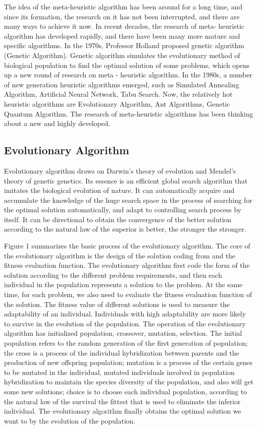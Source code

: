 The idea of the meta-heuristic algorithm has been around for a long
time, and since its formation, the research on it has not been
interrupted, and there are many ways to achieve it now. In recent
decades, the research of meta- heuristic algorithm has developed
rapidly, and there have been many more mature and specific
algorithms. In the 1970s, Professor Holland proposed genetic
algorithm\cite{holland} (Genetic Algorithm). Genetic algorithm
simulates the evolutionary method of biological population to find the
optimal solution of some problems, which opens up a new round of
research on meta - heuristic algorithm. In the 1980s, a number of new
generation heuristic algorithms emerged, such as Simulated Annealing
Algorithm, Artificial Neural Network, Tabu Search. Now, the relatively
hot heuristic algorithms are Evolutionary Algorithm, Ant Algorithms,
Genetic Quantum Algorithm. The research of meta-heuristic algorithms
has been thinking about a new and highly developed\cite{harman}.


\subsection{Evolutionary Algorithm}
%
Evolutionary algorithm draws on Darwin's theory of evolution and
Mendel's theory of genetic genetics. Its essence is an efficient
global search algorithm that imitates the biological evolution of
nature. It can automatically acquire and accumulate the knowledge of
the huge search space in the process of searching for the optimal
solution automatically, and adapt to controlling search process by
itself. It can be directional to obtain the convergence of the better
solution according to the natural law of the superior is better, the
stronger the stronger\cite{deb}.


Figure 1 summarizes the basic process of the evolutionary
algorithm. The core of the evolutionary algorithm is the design of the
solution coding from and the fitness evaluation function. The
evolutionary algorithm first code the form of the solution according
to the different problem requirements, and then each individual in the
population represents a solution to the problem.  At the same time,
for each problem, we also need to evaluate the fitness evaluation
function of the solution. The fitness value of different solutions is
used to measure the adaptability of an individual. Individuals with
high adaptability are more likely to survive in the evolution of the
population.  The operation of the evolutionary algorithm has
initialized population, crossover, mutation, selection. The initial
population refers to the random generation of the first generation of
population; the cross is a process of the individual hybridization
between parents and the production of new offspring population;
mutation is a process of the certain genes to be mutated in the
individual, mutated individuals involved in population hybridization
to maintain the species diversity of the population, and also will get
some new solutions; choice is to choose each individual population,
according to the natural law of the survival the fittest that is used
to eliminate the inferior individual. The evolutionary algorithm
finally obtains the optimal solution we want to by the evolution of
the population.


